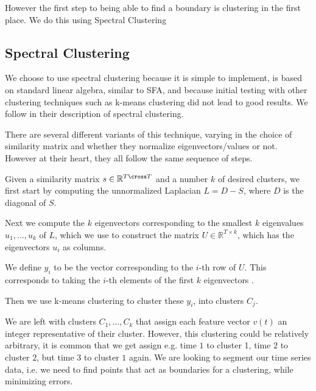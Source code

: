 However the first step to being able to find a boundary is clustering in the first place. We do this using Spectral Clustering

\subsection{Spectral Clustering}
We choose to use spectral clustering because it is simple to implement, is based on standard linear algebra, similar to SFA, and because initial testing with other clustering techniques such as k-means clustering did not lead to good results.  We follow  in their description of spectral clustering.

There are several different variants of this technique, varying in the choice of similarity matrix and whether they normalize eigenvectors/values or not. However at their heart, they all follow the same sequence of steps.

Given a similarity matrix $s \in \mathbb{R}^{T\cross T}$ and a number $k$ of desired clusters, we first start by computing the unnormalized Laplacian $L=D-S$, where $D$ is the diagonal of $S$.

Next we compute the $k$ eigenvectors corresponding to the smallest $k$ eigenvalues  $u_1,\ldots,u_k$ of $L$, which we use to construct the matrix $U\in \mathbb{R}^{T \times k}$, which has the eigenvectors $u_i$ as columns.

We define $y_i$ to be the vector corresponding to the $i$-th row of $U$. This corresponds to taking the $i$-th elements of the first $k$ eigenvectors .

Then we use k-means clustering to cluster these  $y_i$, into clusters $C_j$.

We are left with clusters $C_1,\ldots, C_k$ that assign each feature vector $v(t)$ an integer representative of their cluster. However, this clustering could be relatively arbitrary, it is common that we get assign e.g. time $1$ to cluster 1, time $2$ to cluster $2$, but time $3$ to cluster $1$ again. We are looking to segment our time series data, i.e. we need to find points that act as boundaries for a clustering, while minimizing errors.
